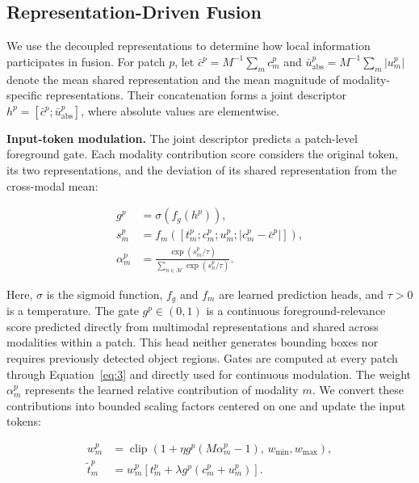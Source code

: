 \subsection{Representation-Driven Fusion}
\label{subsec:33}

We use the decoupled representations to determine how local information participates in fusion. For patch \(p\), let \(\bar c^p=M^{-1}\sum_m c_m^p\) and \(\bar u_{\mathrm{abs}}^p=M^{-1}\sum_m|u_m^p|\) denote the mean shared representation and the mean magnitude of modality-specific representations. Their concatenation forms a joint descriptor \(h^p=[\bar c^p;\bar u_{\mathrm{abs}}^p]\), where absolute values are elementwise.

\textbf{Input-token modulation.} The joint descriptor predicts a patch-level foreground gate. Each modality contribution score considers the original token, its two representations, and the deviation of its shared representation from the cross-modal mean:

\begin{equation}
\begin{aligned}
g^p&=\sigma\!\left(f_g(h^p)\right),\\
s_m^p&=f_m\!\left([t_m^p;c_m^p;u_m^p;|c_m^p-\bar c^p|]\right),\\
\alpha_m^p&=\frac{\exp(s_m^p/\tau)}{\sum_{n\in\mathcal M}\exp(s_n^p/\tau)}.
\end{aligned}
\label{eq:3}
\end{equation}

Here, \(\sigma\) is the sigmoid function, \(f_g\) and \(f_m\) are learned prediction heads, and \(\tau>0\) is a temperature. The gate \(g^p\in(0,1)\) is a continuous foreground-relevance score predicted directly from multimodal representations and shared across modalities within a patch. This head neither generates bounding boxes nor requires previously detected object regions. Gates are computed at every patch through Equation~\eqref{eq:3} and directly used for continuous modulation. The weight \(\alpha_m^p\) represents the learned relative contribution of modality \(m\). We convert these contributions into bounded scaling factors centered on one and update the input tokens:

\begin{equation}
\begin{aligned}
w_m^p
&=\operatorname{clip}\!\left(1+\eta g^p(M\alpha_m^p-1),\,w_{\min},w_{\max}\right),\\
\widetilde t_m^p
&=w_m^p\left[t_m^p+\lambda g^p(c_m^p+u_m^p)\right].
\end{aligned}
\label{eq:4}
\end{equation}

